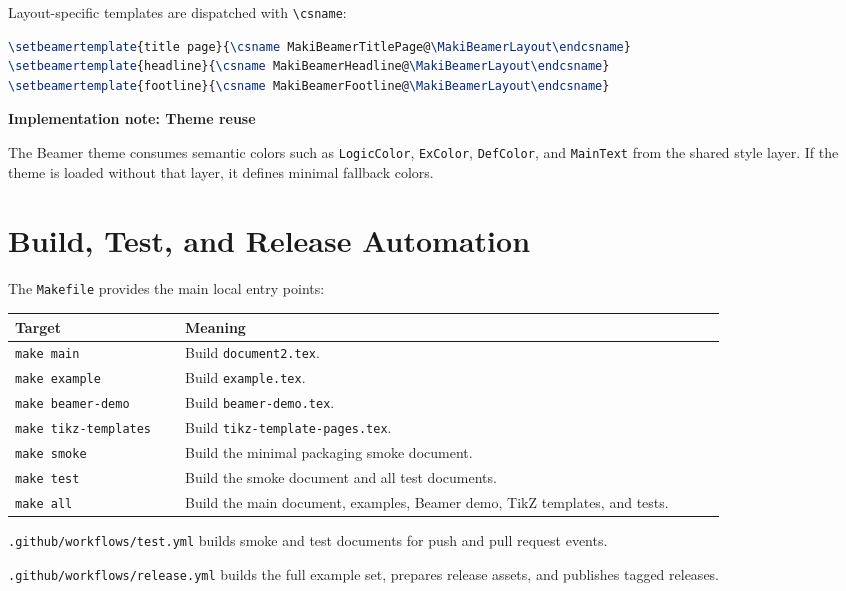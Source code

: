 \documentclass[a4paper,11pt]{ltxdoc}
\newcommand{\mfile}[1]{\texttt{#1}}
\newcommand{\mcmd}[1]{\texttt{\textbackslash#1}}
\newcommand{\mkey}[1]{\texttt{#1}}
\newenvironment{implementation}[1]
  {\par\medskip\noindent\textbf{\color{MakiBlue}Implementation note: #1}\par\smallskip}
  {\par\medskip}
\begin{document}
Layout-specific templates are dispatched with \mcmd{csname}:

\begin{lstlisting}[language=TeX]
\setbeamertemplate{title page}{\csname MakiBeamerTitlePage@\MakiBeamerLayout\endcsname}
\setbeamertemplate{headline}{\csname MakiBeamerHeadline@\MakiBeamerLayout\endcsname}
\setbeamertemplate{footline}{\csname MakiBeamerFootline@\MakiBeamerLayout\endcsname}
\end{lstlisting}

\begin{implementation}{Theme reuse}
The Beamer theme consumes semantic colors such as \mkey{LogicColor},
\mkey{ExColor}, \mkey{DefColor}, and \mkey{MainText} from the shared style layer.
If the theme is loaded without that layer, it defines minimal fallback colors.
\end{implementation}

\section{Build, Test, and Release Automation}

The \mfile{Makefile} provides the main local entry points:

\begin{longtable}{@{}p{0.22\linewidth}p{0.7\linewidth}@{}}
\toprule
Target & Meaning \\
\midrule
\mkey{make main} & Build \mfile{document2.tex}.\\
\mkey{make example} & Build \mfile{example.tex}.\\
\mkey{make beamer-demo} & Build \mfile{beamer-demo.tex}.\\
\mkey{make tikz-templates} & Build \mfile{tikz-template-pages.tex}.\\
\mkey{make smoke} & Build the minimal packaging smoke document.\\
\mkey{make test} & Build the smoke document and all test documents.\\
\mkey{make all} & Build the main document, examples, Beamer demo, TikZ templates, and tests.\\
\bottomrule
\end{longtable}

\noindent\mfile{.github/workflows/test.yml}
builds smoke and test documents for push and pull request events.

\noindent\mfile{.github/workflows/release.yml}
builds the full example set, prepares release assets, and publishes tagged
releases.
\end{document}
